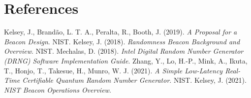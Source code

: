 \documentclass[conference]{IEEEtran}
\begin{document}
\section*{References}  


\begin{thebibliography}{9}
 Kelsey, J., Brand\~{a}o, L. T. A., Peralta, R., Booth, J. (2019). \textit{A Proposal for a Beacon Design}. NIST.
 Kelsey, J. (2018). \textit{Randomness Beacon Background and Overview}. NIST.
 Mechalas, D. (2018). \textit{Intel Digital Random Number Generator (DRNG) Software Implementation Guide}.
 Zhang, Y., Lo, H.-P., Mink, A., Ikuta, T., Honjo, T., Takesue, H., Munro, W. J. (2021). \textit{A Simple Low-Latency Real-Time Certifiable Quantum Random Number Generator}. NIST.
 Kelsey, J. (2021). \textit{NIST Beacon Operations Overview}.
\end{thebibliography}
\end{document}
